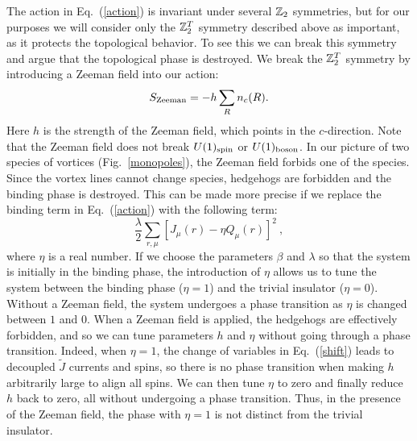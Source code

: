 The action in Eq.~(\ref{action}) is invariant under several $\mathbb{Z}_2$ symmetries, but for our purposes we will consider only the $\mathbb{Z}_2^T$ symmetry described above as important, as it protects the topological behavior. To see this we can break this symmetry and argue that the topological phase is destroyed.
We break the $\mathbb{Z}_2^T$ symmetry by introducing a Zeeman field into our action:
\begin{equation}
S_{\rm Zeeman}=-h\sum_R n_c(R).
\label{Zeeman}
\end{equation}
Here $h$ is the strength of the Zeeman field, which points in the $c$-direction. Note that the Zeeman field does not break $U(1)_{\rm spin}$ or $U(1)_{\rm boson}$. In our picture of two species of vortices (Fig.~\ref{monopoles}), the Zeeman field forbids one of the species. Since the vortex lines cannot change species, hedgehogs are forbidden and the binding phase is destroyed. 
This can be made more precise if we replace the binding term in Eq.~(\ref{action}) with the following term:
\begin{equation}
\frac{\lambda}{2}\sum_{r,\mu} [ J_\mu(r) - \eta Q_\mu(r)]^2 ~,
\label{tbind}
\end{equation}
where $\eta$ is a real number. If we choose the parameters $\beta$ and $\lambda$ so that the system is initially in the binding phase, the introduction of $\eta$ allows us to tune the system between the binding phase ($\eta=1$) and the trivial insulator ($\eta=0$). Without a Zeeman field, the system undergoes a phase transition as $\eta$ is changed between $1$ and $0$. 
When a Zeeman field is applied, the hedgehogs are effectively forbidden, and so we can tune parameters $h$ and $\eta$ without going through a phase transition. Indeed, when $\eta=1$, the change of variables in Eq.~(\ref{shift}) leads to decoupled $\tilde{J}$ currents and spins, so there is no phase transition when making $h$ arbitrarily large to align all spins. We can then tune $\eta$ to zero and finally reduce $h$ back to zero, all without undergoing a phase transition.  Thus, in the presence of the Zeeman field, the phase with $\eta=1$ is not distinct from the trivial insulator.


